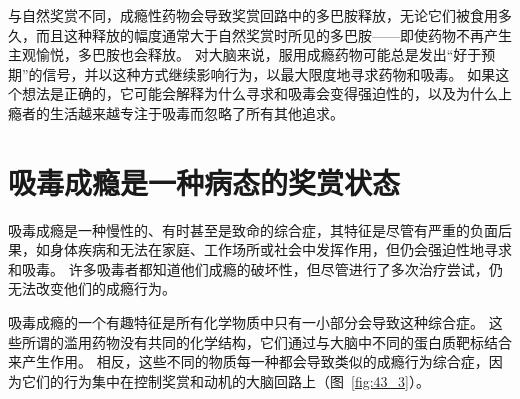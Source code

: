 与自然奖赏不同，成瘾性药物会导致奖赏回路中的多巴胺释放，无论它们被食用多久，而且这种释放的幅度通常大于自然奖赏时所见的多巴胺——即使药物不再产生主观愉悦，多巴胺也会释放。
对大脑来说，服用成瘾药物可能总是发出“好于预期”的信号，并以这种方式继续影响行为，以最大限度地寻求药物和吸毒。
如果这个想法是正确的，它可能会解释为什么寻求和吸毒会变得强迫性的，以及为什么上瘾者的生活越来越专注于吸毒而忽略了所有其他追求。



\section{吸毒成瘾是一种病态的奖赏状态}

吸毒成瘾是一种慢性的、有时甚至是致命的综合症，其特征是尽管有严重的负面后果，如身体疾病和无法在家庭、工作场所或社会中发挥作用，但仍会强迫性地寻求和吸毒。
许多吸毒者都知道他们成瘾的破坏性，但尽管进行了多次治疗尝试，仍无法改变他们的成瘾行为。


吸毒成瘾的一个有趣特征是所有化学物质中只有一小部分会导致这种综合症。
这些所谓的滥用药物没有共同的化学结构，它们通过与大脑中不同的蛋白质靶标结合来产生作用。
相反，这些不同的物质每一种都会导致类似的成瘾行为综合症，因为它们的行为集中在控制奖赏和动机的大脑回路上（图~\ref{fig:43_3}）。


